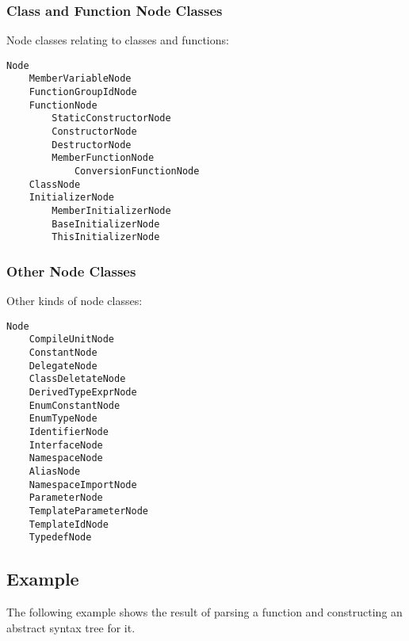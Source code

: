 \documentclass[a4paper,oneside,11pt]{book}
\theoremstyle{definition}
\begin{document}
\clearpage
\subsubsection{Class and Function Node Classes}

Node classes relating to classes and functions:

\begin{verbatim}
Node
    MemberVariableNode
    FunctionGroupIdNode
    FunctionNode
        StaticConstructorNode
        ConstructorNode
        DestructorNode
        MemberFunctionNode
            ConversionFunctionNode
    ClassNode
    InitializerNode
        MemberInitializerNode
        BaseInitializerNode
        ThisInitializerNode
\end{verbatim}

\subsubsection{Other Node Classes}

Other kinds of node classes:

\begin{verbatim}
Node
    CompileUnitNode
    ConstantNode
    DelegateNode
    ClassDeletateNode
    DerivedTypeExprNode
    EnumConstantNode
    EnumTypeNode
    IdentifierNode
    InterfaceNode
    NamespaceNode
    AliasNode
    NamespaceImportNode
    ParameterNode
    TemplateParameterNode
    TemplateIdNode
    TypedefNode
\end{verbatim}

\clearpage
\subsection{Example}

The following example shows the result of parsing a function and constructing an abstract syntax tree for it.
\end{document}
